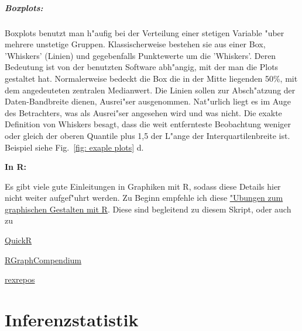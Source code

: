 \documentclass[a4paper,twoside]{tufte-book}\usepackage[]{graphicx}\usepackage[]{color}
\begin{document}
\paragraph{Boxplots:} Boxplots benutzt man h"aufig bei der Verteilung einer stetigen Variable "uber mehrere unstetige Gruppen. Klassischerweise bestehen sie aus einer Box, 'Whiskers' (Linien) und gegebenfalls Punktewerte um die 'Whiskers'. Deren Bedeutung ist von der benutzten Software abh"angig, mit der man die Plots gestaltet hat. Normalerweise bedeckt die Box die in der Mitte liegenden 50\%, mit dem angedeuteten zentralen Medianwert. Die Linien sollen zur Absch"atzung der Daten-Bandbreite dienen, Ausrei"ser ausgenommen. Nat"urlich liegt es im Auge des Betrachters, was als Ausrei"ser angesehen wird und was nicht. Die exakte Definition von Whiskers besagt, dass die weit entfernteste Beobachtung weniger oder gleich der oberen Quantile plus 1,5 der L"ange der Interquartilenbreite ist. Beispiel siehe Fig.~\ref{fig: exaple plots} d.

\vspace{1cm}
\begin{fullwidth}
\begin{mdframed}
    
\textbf{In R:} 

Es gibt viele gute Einleitungen in Graphiken mit R, sodass diese Details hier nicht weiter aufgef"uhrt werden. Zu Beginn empfehle ich diese  \href{https://github.com/florianhartig/ResearchSkills/tree/master/Labs/Statistics/Practicals/GraphicsInR}{"Ubungen zum graphischen Gestalten mit R}. Diese sind begleitend zu diesem Skript, oder auch zu

\begin{itemize*}
  \item \href{http://www.statmethods.net/graphs/index.html}{QuickR}
  \item \href{http://shinyapps.org/apps/RGraphCompendium/index.php}{RGraphCompendium}
  \item \href{http://www.uni-kiel.de/psychologie/rexrepos/rerDiagrams.html}{rexrepos}
\end{itemize*}

\end{mdframed}
\end{fullwidth} 


\chapter{Inferenzstatistik}

\end{document}
